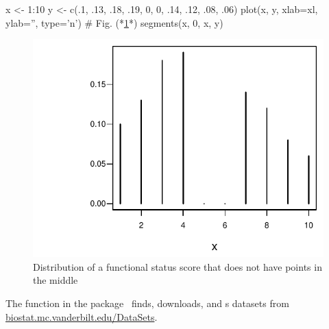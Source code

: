 \begin{Schunk}
\begin{Sinput}
x <- 1:10
y <- c(.1, .13, .18, .19, 0, 0, .14, .12, .08, .06)
plot(x, y, xlab=xl, ylab='', type='n')   # Fig. (*\ref{fig:descript-ordb}*)
segments(x, 0, x, y)
\end{Sinput}
\begin{figure}[htbp]

\centerline{\includegraphics{descript-ordb-1} }

\caption[Ordinal variable with strange distribution]{Distribution of a functional status score that does not have points in the middle}\label{fig:descript-ordb}
\end{figure}
\end{Schunk}
The  function in the  package~\cite{Hmisc}
finds, downloads, and s datasets from
\href{http://biostat.mc.vanderbilt.edu/wiki/Main/DataSets}{biostat.mc.vanderbilt.edu/DataSets}.
